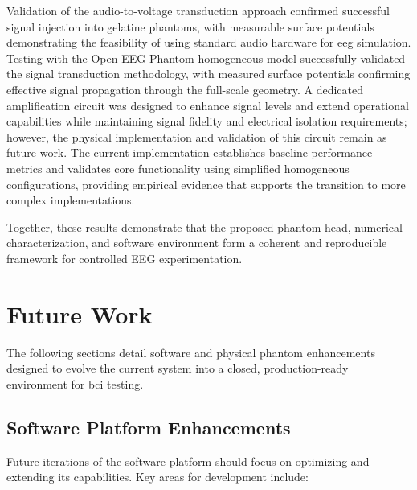 \documentclass[../00_Main.tex]{subfiles}
\begin{document}
Validation of the audio-to-voltage transduction approach confirmed successful signal injection into gelatine phantoms, with measurable surface potentials demonstrating the feasibility of using standard audio hardware for \gls{eeg} simulation. Testing with the Open EEG Phantom homogeneous model successfully validated the signal transduction methodology, with measured surface potentials confirming effective signal propagation through the full-scale geometry. A dedicated amplification circuit was designed to enhance signal levels and extend operational capabilities while maintaining signal fidelity and electrical isolation requirements; however, the physical implementation and validation of this circuit remain as future work. The current implementation establishes baseline performance metrics and validates core functionality using simplified homogeneous configurations, providing empirical evidence that supports the transition to more complex implementations.

Together, these results demonstrate that the proposed phantom head, numerical characterization, and software environment form a coherent and reproducible framework for controlled EEG experimentation.

\clearpage
\section{Future Work}

The following sections detail software and physical phantom enhancements designed to evolve the current system into a closed, production-ready environment for \gls{bci} testing.

\subsection{Software Platform Enhancements}

Future iterations of the software platform should focus on optimizing and extending its capabilities. Key areas for development include:
\end{document}
